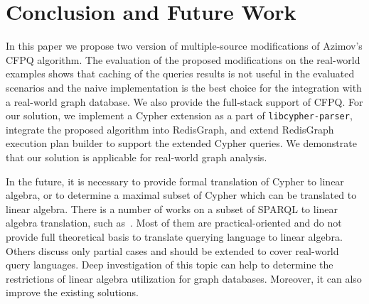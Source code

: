 \section{Conclusion and Future Work}
In this paper we propose two version of multiple-source modifications of Azimov's CFPQ algorithm.
The evaluation of the proposed modifications on the real-world examples shows that caching of the queries results is not useful in the evaluated scenarios and the naive implementation is the best choice for the integration with a real-world graph database.
We also provide the full-stack support of CFPQ.
For our solution, we implement a Cypher extension as a part of \texttt{libcypher-parser}, integrate the proposed algorithm into RedisGraph, and extend RedisGraph execution plan builder to support the extended Cypher queries.
We demonstrate that our solution is applicable for real-world graph analysis.

In the future, it is necessary to provide formal translation of Cypher to linear algebra, or to determine a maximal subset of Cypher which can be translated to linear algebra.
There is a number of works on a subset of SPARQL to linear algebra translation, such as~\cite{10.14778/3229863.3236239,10.1007/978-3-642-34002-4_36,10.1145/3302424.3303962,DBLP:journals/corr/MetzlerM15a}.
Most of them are practical-oriented and do not provide full theoretical basis to translate querying language to linear algebra.
Others discuss only partial cases and should be extended to cover real-world query languages.
Deep investigation of this topic can help to determine the restrictions of linear algebra utilization for graph databases.
Moreover, it can also improve the existing solutions.


